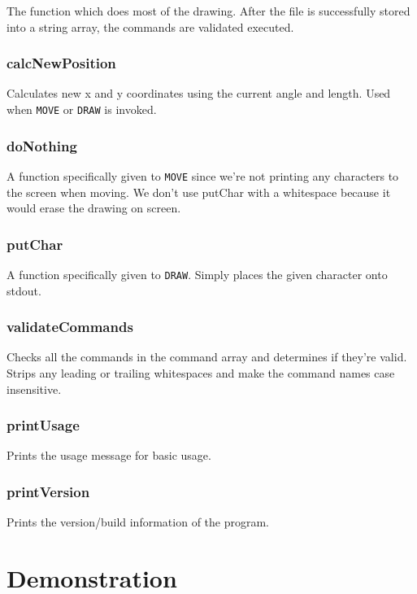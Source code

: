 \documentclass[a4paper, 12pt, titlepage]{article}
\newcommand{\code}[1]{\small\texttt{#1}\normalsize}
\begin{document}
The function which does most of the drawing. After the file is successfully 
stored into a string array, the commands are validated executed.

\subsubsection{calcNewPosition}

Calculates new x and y coordinates using the current angle and length.
Used when \code{MOVE} or \code{DRAW} is invoked.

\subsubsection{doNothing}

A function specifically given to \code{MOVE} since we're not printing any 
characters to the screen when moving. We don't use putChar with a whitespace 
because it would erase the drawing on screen.

\subsubsection{putChar}

A function specifically given to \code{DRAW}. Simply places the given 
character onto stdout.

\subsubsection{validateCommands}

Checks all the commands in the command array and determines if they're valid.
Strips any leading or trailing whitespaces and make the command names case 
insensitive.

\subsubsection{printUsage}

Prints the usage message for basic usage.

\subsubsection{printVersion}

Prints the version/build information of the program.


\newpage


\section{Demonstration}
\end{document}
